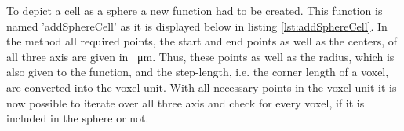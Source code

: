 To depict a cell as a sphere a new function had to be created. This function is named 'addSphereCell' as it is displayed below in listing \ref{lst:addSphereCell}. In the method all required points, the start and end points as well as the centers, of all three axis are given in \SI{}{\micro\metre}. Thus, these points as well as the radius, which is also given to the function, and the step-length, i.e. the corner length of a voxel, are converted into the voxel unit. \newline
With all necessary points in the voxel unit it is now possible to iterate over all three axis and check for every voxel, if it is included in the sphere or not. \newline



